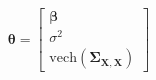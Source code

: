 \begin{equation}
	\boldsymbol{\theta}
	=
	\left[
		\begin{array}{c}
			\boldsymbol{\beta}                                                        \\
			\sigma^2                                                                  \\
			\mathrm{vech} \left( \boldsymbol{\Sigma}_{\mathbf{X}, \mathbf{X}} \right) 
		\end{array}
	\right]
	\label{strRegression-theta-csa}
\end{equation}
